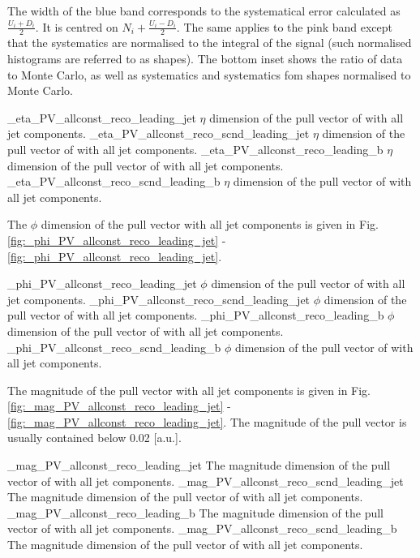 The width of the blue band corresponds to the systematical error calculated as $\frac{U_{i}+D_{i}}{2}$. It is centred on $N_{i} + \frac{U_{i}-D_{i}}{2}$. The same applies to the pink band except that the systematics are normalised to the integral of the signal (such normalised histograms are referred to as shapes). The bottom inset shows the ratio of data to Monte Carlo, as well as systematics and systematics fom shapes normalised to Monte Carlo.

          {_eta_PV_allconst_reco_leading_jet}
          {$\eta$ dimension of the pull vector of \leadingjet with all jet components.}
          {_eta_PV_allconst_reco_scnd_leading_jet}
          {$\eta$ dimension of the pull vector of \scndleadingjet with all jet components.}
          {_eta_PV_allconst_reco_leading_b}
          {$\eta$ dimension of the pull vector of \leadingb with all jet components.}
          {_eta_PV_allconst_reco_scnd_leading_b}
          {$\eta$ dimension of the pull vector of \scndleadingb with all jet components.}

The $\phi$ dimension of the pull vector with all jet components is given in Fig. \ref{fig:_phi_PV_allconst_reco_leading_jet} - \ref{fig:_phi_PV_allconst_reco_leading_jet}. 

          {_phi_PV_allconst_reco_leading_jet}
          {$\phi$ dimension of the pull vector of \leadingjet with all jet components.}
          {_phi_PV_allconst_reco_scnd_leading_jet}
          {$\phi$ dimension of the pull vector of \scndleadingjet with all jet components.}
          {_phi_PV_allconst_reco_leading_b}
          {$\phi$ dimension of the pull vector of \leadingb with all jet components.}
          {_phi_PV_allconst_reco_scnd_leading_b}
          {$\phi$ dimension of the pull vector of \scndleadingb with all jet components.}

The magnitude of the pull vector with all jet components is given in Fig. \ref{fig:_mag_PV_allconst_reco_leading_jet} - \ref{fig:_mag_PV_allconst_reco_leading_jet}. The magnitude of the pull vector is usually contained below 0.02 [a.u.].

          {_mag_PV_allconst_reco_leading_jet}
          {The magnitude dimension of the pull vector of \leadingjet with all jet components.}
          {_mag_PV_allconst_reco_scnd_leading_jet}
          {The magnitude dimension of the pull vector of \scndleadingjet with all jet components.}
          {_mag_PV_allconst_reco_leading_b}
          {The magnitude dimension of the pull vector of \leadingb with all jet components.}
          {_mag_PV_allconst_reco_scnd_leading_b}
          {The magnitude dimension of the pull vector of \scndleadingb with all jet components.}

